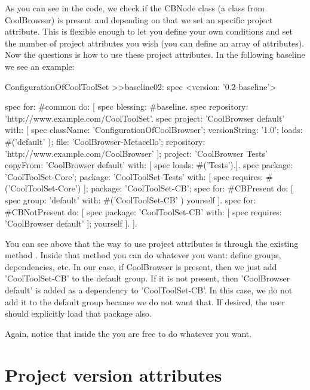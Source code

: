 \documentclass[a4paper,10pt,twoside]{book}
\begin{document}
\begin{code}{}
\begin{code}{}
As you can see in the code, we check if the CBNode class (a class from CoolBrowser) is present and depending on that we set an specific project attribute.
This is flexible enough to let you define your own conditions and set the number of project attributes you wish (you can define an array of attributes).  
Now the questions is how to use these project attributes. In the following baseline we see an example:

\begin{code}{}
ConfigurationOfCoolToolSet >>baseline02: spec 
	<version: '0.2-baseline'>
	
	spec for: #common do: [
		spec blessing: #baseline.
		spec repository: 'http://www.example.com/CoolToolSet'.
		spec project: 'CoolBrowser default' with: [
				spec
					className: 'ConfigurationOfCoolBrowser';
					versionString: '1.0';
					loads: #('default' );
					file: 'CoolBrowser-Metacello';
					repository: 'http://www.example.com/CoolBrowser' ];
			project: 'CoolBrowser Tests' 
				copyFrom: 'CoolBrowser default' 
				with: [ spec loads: #('Tests').].
		spec 
			package: 'CoolToolSet-Core';
			package: 'CoolToolSet-Tests' with: [ 
				spec requires: #('CoolToolSet-Core') ];
			package: 'CoolToolSet-CB';			
		spec for: #CBPresent do: [
			spec
				group: 'default' with: #('CoolToolSet-CB' )
				yourself ].
		spec for: #CBNotPresent do: [
			spec 
				package: 'CoolToolSet-CB' with: [ spec requires: 'CoolBrowser default' ];
				yourself ].
			].
		
\end{code}

You can see above that the way to use project attributes is through the existing method . Inside that method you can do whatever you want: define groups, dependencies, etc. In our case, if CoolBrowser is present, then we just add 'CoolToolSet-CB' to the default group. If it is not present, then 'CoolBrowser default' is added as a dependency to 'CoolToolSet-CB'. In this case, we do not add it to the default group because we do not want that. If desired, the user should explicitly load that package also. 

Again, notice that inside the  you are free to do whatever you want.

\section{Project version attributes}
 
 

\end{code}
\end{code}
\end{document}
